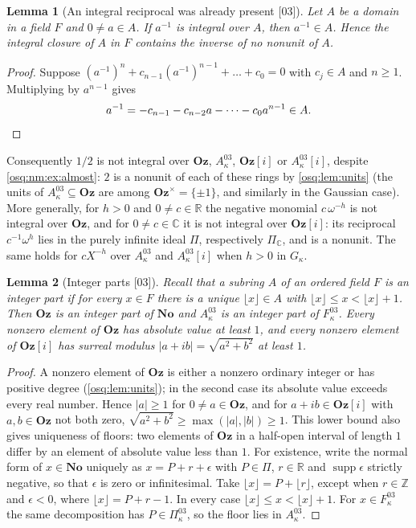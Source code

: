 \documentclass[11pt,letterpaper]{article}
\numberwithin{equation}{section}
\newtheorem{lemma}[lemma]{Lemma}
\theoremstyle{definition}
\theoremstyle{remark}
\theoremstyle{plain}
\newcommand{\No}{\mathbf{No}}
\newcommand{\Oz}{\mathbf{Oz}}
\newcommand{\GOz}{\Oz[i]}
\newcommand{\Z}{\mathbb Z}
\newcommand{\R}{\mathbb R}
\newcommand{\C}{\mathbb C}
\newcommand{\supp}{\operatorname{supp}}
\newcommand{\src}[1]{\textup{\textsf{[#1]}}}
\begin{document}
\begin{lemma}[An integral reciprocal was already present \src{03}]\label{osq:nm:lem:reciprocal}
Let $A$ be a domain in a field $F$ and $0\ne a\in A$. If $a^{-1}$ is integral over $A$,
then $a^{-1}\in A$. Hence the integral closure of $A$ in $F$ contains the inverse of no
nonunit of $A$.
\end{lemma}

\begin{proof}
Suppose $(a^{-1})^n+c_{n-1}(a^{-1})^{n-1}+\dots+c_0=0$ with $c_j\in A$ and $n\ge1$.
Multiplying by $a^{n-1}$ gives
\[
 a^{-1}=-c_{n-1}-c_{n-2}a-\dots-c_0a^{n-1}\in A. \qedhere
\]
\end{proof}

Consequently $1/2$ is not integral over $\Oz$, $A^{03}_\kappa$, $\GOz$ or
$A^{03}_\kappa[i]$, despite \cref{osq:nm:ex:almost}: $2$ is a nonunit of each of these
rings by \cref{osq:lem:units} (the units of $A^{03}_\kappa\subseteq\Oz$ are among
$\Oz^\times=\{\pm1\}$, and similarly in the Gaussian case). More generally, for $h>0$ and
$0\ne c\in\R$ the negative monomial $c\,\omega^{-h}$ is not integral over $\Oz$, and for
$0\ne c\in\C$ it is not integral over $\GOz$: its reciprocal $c^{-1}\omega^h$ lies in the
purely infinite ideal $\Pi$, respectively $\Pi_\C$, and is a nonunit. The same holds for
$cX^{-h}$ over $A^{03}_\kappa$ and $A^{03}_\kappa[i]$ when $h>0$ in $G_\kappa$.

\begin{lemma}[Integer parts \src{03}]\label{osq:nm:lem:intpart}
Recall that a subring $A$ of an ordered field $F$ is an \emph{integer part} if for every
$x\in F$ there is a unique $\lfloor x\rfloor\in A$ with $\lfloor x\rfloor\le x<\lfloor
x\rfloor+1$. Then $\Oz$ is an integer part of $\No$ and $A^{03}_\kappa$ is an integer part
of $F^{03}_\kappa$. Every nonzero element of $\Oz$ has absolute value at least $1$, and
every nonzero element of $\GOz$ has surreal modulus $|a+ib|=\sqrt{a^2+b^2}$ at least $1$.
\end{lemma}

\begin{proof}
A nonzero element of $\Oz$ is either a nonzero ordinary integer or has positive degree
(\cref{osq:lem:units}); in the second case its absolute value exceeds every real number.
Hence $|a|\ge1$ for $0\ne a\in\Oz$, and for $a+ib\in\GOz$ with $a,b\in\Oz$ not both zero,
$\sqrt{a^2+b^2}\ge\max(|a|,|b|)\ge1$. This lower bound also gives uniqueness of floors:
two elements of $\Oz$ in a half-open interval of length $1$ differ by an element of
absolute value less than $1$. For existence, write the normal form of $x\in\No$ uniquely
as $x=P+r+\epsilon$ with $P\in\Pi$, $r\in\R$ and $\supp\epsilon$ strictly negative, so
that $\epsilon$ is zero or infinitesimal. Take $\lfloor x\rfloor=P+\lfloor r\rfloor$,
except when $r\in\Z$ and $\epsilon<0$, where $\lfloor x\rfloor=P+r-1$. In every case
$\lfloor x\rfloor\le x<\lfloor x\rfloor+1$. For $x\in F^{03}_\kappa$ the same decomposition
has $P\in\Pi^{03}_\kappa$, so the floor lies in $A^{03}_\kappa$.
\end{proof}
\end{document}
